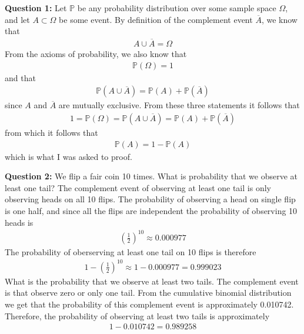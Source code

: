 \textbf{Question 1:} Let $\mathbb{P}$ be any probability distribution over some sample space $\Omega$, and let $A \subset \Omega$ be some event. By definition of the complement event $\overline{A}$, we know that 
\begin{align}
A \cup \overline{A} = \Omega 
\end{align}
From the axioms of probability, we also know that
\begin{align}
\mathbb{P}(\Omega) = 1
\end{align}
and that
\begin{align}
\mathbb{P}(A \cup \overline{A}) = \mathbb{P}(A) + \mathbb{P}(\overline{A})
\end{align}
since $A$ and $\overline{A}$ are mutually exclusive.
From these three statements it follows that
\begin{align}
1 = \mathbb{P}(\Omega) = \mathbb{P}(A \cup \overline{A}) = \mathbb{P}(A) + \mathbb{P}(\overline{A})
\end{align}
from which it follows that
\begin{align}
\mathbb{P}(A) = 1 - \mathbb{P}(A)
\end{align}
which is what I was asked to proof.

\textbf{Question 2:} We flip a fair coin 10 times. What is probability that we observe at least one tail? The complement event of observing at least one tail is only observing heads on all 10 flips. The probability of observing a head on single flip is one half, and since all the flips are independent the probability of observing 10 heads is 
\begin{align}
\left(\frac{1}{2}\right)^{10} \approx 0.000977 
\end{align}
The probability of oberserving at least one tail on 10 flips is therefore
\begin{align}
1 - \left(\frac{1}{2}\right)^{10} \approx  1 - 0.000977 = 0.999023
\end{align}
What is the probability that we observe at least two tails. The complement event is that observe zero or only one tail. From the cumulative binomial distribution we get that the probability of this complement event is approximately 0.010742. Therefore, the probability of observing at least two tails is approximately
\begin{align}
1 - 0.010742 = 0.989258
\end{align} 